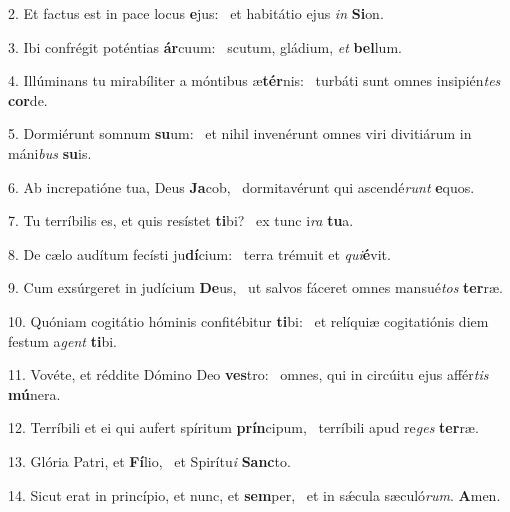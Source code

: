 2. Et factus est in pace locus \textbf{e}jus: \ast\  et habitátio ejus \textit{in} \textbf{Si}on.\

3. Ibi confrégit poténtias \textbf{ár}cuum: \ast\  scutum, gládium, \textit{et} \textbf{bel}lum.\

4. Illúminans tu mirabíliter a móntibus æ\textbf{tér}nis: \ast\  turbáti sunt omnes insipién\textit{tes} \textbf{cor}de.\

5. Dormiérunt somnum \textbf{su}um: \ast\  et nihil invenérunt omnes viri divitiárum in máni\textit{bus} \textbf{su}is.\

6. Ab increpatióne tua, Deus \textbf{Ja}cob, \ast\  dormitavérunt qui ascendé\textit{runt} \textbf{e}quos.\

7. Tu terríbilis es, et quis resístet \textbf{ti}bi? \ast\  ex tunc i\textit{ra} \textbf{tu}a.\

8. De cælo audítum fecísti ju\textbf{dí}cium: \ast\  terra trémuit et \textit{qui}\textbf{é}vit.\

9. Cum exsúrgeret in judícium \textbf{De}us, \ast\  ut salvos fáceret omnes mansué\textit{tos} \textbf{ter}ræ.\

10. Quóniam cogitátio hóminis confitébitur \textbf{ti}bi: \ast\  et relíquiæ cogitatiónis diem festum a\textit{gent} \textbf{ti}bi.\

11. Vovéte, et réddite Dómino Deo \textbf{ves}tro: \ast\  omnes, qui in circúitu ejus affér\textit{tis} \textbf{mú}nera.\

12. Terríbili et ei qui aufert spíritum \textbf{prín}cipum, \ast\  terríbili apud re\textit{ges} \textbf{ter}ræ.\

13. Glória Patri, et \textbf{Fí}lio, \ast\  et Spirítu\textit{i} \textbf{Sanc}to.\

14. Sicut erat in princípio, et nunc, et \textbf{sem}per, \ast\  et in sǽcula sæculó\textit{rum}. \textbf{A}men.\

